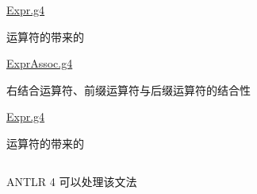 \begin{frame}{}
  \begin{center}
    {\Large \href{https://github.com/courses-at-nju-by-hfwei/2023-compilers-coding/blob/main/src/main/antlr/expr/Expr.g4}{Expr.g4}}
  \end{center}

  \begin{center}
    运算符的带来的
  \end{center}
\end{frame}

\begin{frame}{}
  \begin{center}
    {\Large \href{https://github.com/courses-at-nju-by-hfwei/2023-compilers-coding/blob/main/src/main/antlr/expr/ExprAssoc.g4}{ExprAssoc.g4}}

    \vspace{0.30cm}

    \vspace{0.30cm}
    右结合运算符、前缀运算符与后缀运算符的结合性
  \end{center}
\end{frame}

\begin{frame}{}
  \begin{center}
    {\Large \href{https://github.com/courses-at-nju-by-hfwei/compilers-antlr/blob/main/src/main/antlr/expr/Expr.g4}{Expr.g4}}
  \end{center}


  \begin{center}
    运算符的带来的
  \end{center}
\end{frame}

\begin{frame}{}
  \begin{columns}
      \vspace{0.20cm}
      \begin{center}
        ANTLR 4 可以处理该文法
      \end{center}
  \end{columns}
\end{frame}

